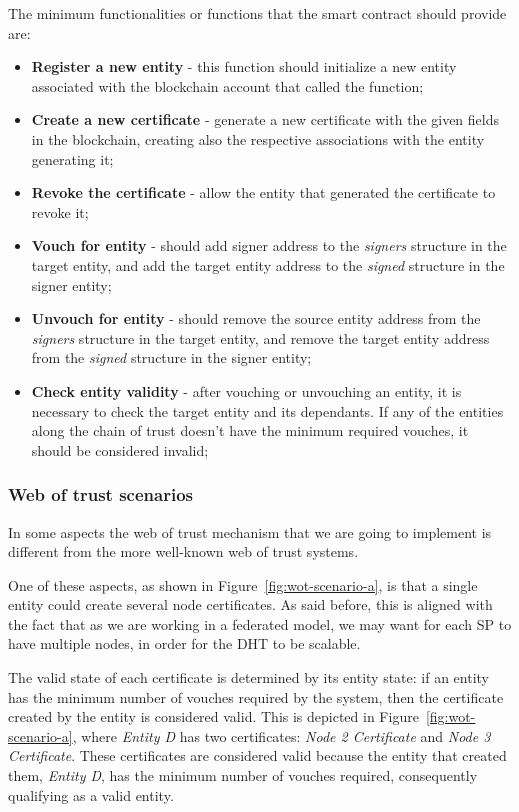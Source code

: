 The minimum functionalities or functions that the smart contract should provide are:

\begin{itemize}
  \item \textbf{Register a new entity} - this function should initialize a new entity associated with the blockchain account that called the function;
  \item \textbf{Create a new certificate} - generate a new certificate with the given fields in the blockchain, creating also the respective associations with the entity generating it;
  \item \textbf{Revoke the certificate} - allow the entity that generated the certificate to revoke it;
  \item \textbf{Vouch for entity} - should add signer address to the \textit{signers} structure in the target entity, and add the target entity address to the \textit{signed} structure in the signer entity;
  \item \textbf{Unvouch for entity} - should remove the source entity address from the \textit{signers} structure in the target entity, and remove the target entity address from the \textit{signed} structure in the signer entity;
  \item \textbf{Check entity validity} - after vouching or unvouching an entity, it is necessary to check the target entity and its dependants. If any of the entities along the chain of trust doesn't have the minimum required vouches, it should be considered invalid;
\end{itemize}


\subsubsection{Web of trust scenarios}

In some aspects the web of trust mechanism that we are going to implement is different from the more well-known web of trust systems.

One of these aspects, as shown in Figure~\ref{fig:wot-scenario-a}, is that a single entity could create several node certificates.
As said before, this is aligned with the fact that as we are working in a federated model, we may want for each \ac{SP} to have multiple nodes, in order for the \ac{DHT} to be scalable.

The valid state of each certificate is determined by its entity state: if an entity has the minimum number of vouches required by the system, then the certificate created by the entity is considered valid.
This is depicted in Figure~\ref{fig:wot-scenario-a}, where \textit{Entity D} has two certificates: \textit{Node 2 Certificate} and \textit{Node 3 Certificate}.
These certificates are considered valid because the entity that created them, \textit{Entity D}, has the minimum number of vouches required, consequently qualifying as a valid entity.

